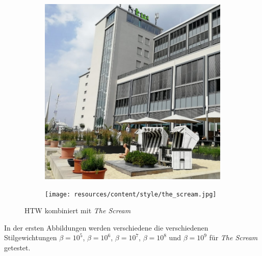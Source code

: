 \begin{figure}[H]
    \centering
    \begin{subfigure}[h]{0.20\textwidth}
        \centering
        \includegraphics[width=\textwidth]{resources/content/content/htw-768x768.jpg}
    \end{subfigure}
    \begin{subfigure}[h]{0.20\textwidth}
        \centering
        \texttt{[image: resources/content/style/the\_scream.jpg]}
    \end{subfigure}
    \caption{HTW kombiniert mit \textit{The Scream} \cite{the_scream_img}}
\end{figure}


In der ersten Abbildungen werden verschiedene die verschiedenen  \\
Stilgewichtungen $ \beta = 10^{5} $, $ \beta = 10^{6} $, $ \beta = 10^{7} $, $ \beta = 10^{8} $ und $ \beta = 10^{9} $ für \textit{The Scream} getestet.

